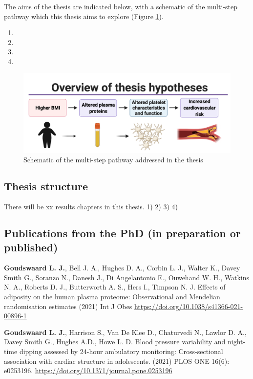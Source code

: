 \documentclass[11pt,twoside]{bristolthesis}
\providecommand{\tightlist}{%
  \setlength{\itemsep}{0pt}\setlength{\parskip}{0pt}}
\begin{document}
The aims of the thesis are indicated below, with a schematic of the multi-step pathway which this thesis aims to explore (Figure \ref{fig:Thesis-schematic}).
\begin{enumerate}
\def\labelenumi{\arabic{enumi})}
\tightlist
\item
\item
\item
\item
\end{enumerate}
\begin{figure}
\includegraphics{figure/Intro_background/Thesis_graphic_overview_without_chapters} \caption[Schematic of the multi-step pathway addressed in the thesis]{Schematic of the multi-step pathway addressed in the thesis}\label{fig:Thesis-schematic}
\end{figure}
\hypertarget{thesis-structure}{%
\subsection{Thesis structure}\label{thesis-structure}}

There will be xx results chapters in this thesis.
1)
2)
3)
4)

\hypertarget{publications-from-the-phd-in-preparation-or-published}{%
\subsection{Publications from the PhD (in preparation or published)}\label{publications-from-the-phd-in-preparation-or-published}}

\textbf{Goudswaard L. J.}, Bell J. A., Hughes D. A., Corbin L. J., Walter K., Davey Smith G., Soranzo N., Danesh J., Di Angelantonio E., Ouwehand W. H., Watkins N. A., Roberts D. J., Butterworth A. S., Hers I., Timpson N. J. Effects of adiposity on the human plasma proteome: Observational and Mendelian randomisation estimates (2021) Int J Obes \url{https://doi.org/10.1038/s41366-021-00896-1}

\textbf{Goudswaard L. J.}, Harrison S., Van De Klee D., Chaturvedi N., Lawlor D. A., Davey Smith G., Hughes A.D., Howe L. D. Blood pressure variability and night-time dipping assessed by 24-hour ambulatory monitoring: Cross-sectional association with cardiac structure in adolescents. (2021) PLOS ONE 16(6): e0253196. \url{https://doi.org/10.1371/journal.pone.0253196}
\end{document}
